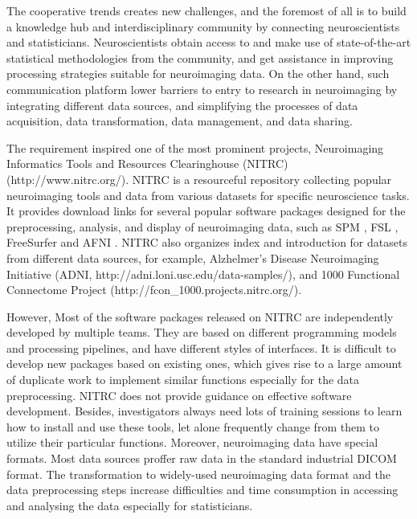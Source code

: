 \documentclass{nature}
\begin{document}
The cooperative trends creates new challenges, and the foremost of all is to build a knowledge hub and interdisciplinary community by connecting neuroscientists and statisticians.  Neuroscientists obtain access to and make use of state-of-the-art statistical methodologies from the community, and get assistance in improving processing strategies suitable for neuroimaging data. On the other hand, such communication platform lower barriers to entry to research in neuroimaging by integrating different data sources, and simplifying the processes of data acquisition, data transformation, data management, and data sharing. 

The requirement inspired one of the most prominent projects, Neuroimaging Informatics Tools and Resources Clearinghouse (NITRC) (http://www.nitrc.org/). NITRC is a resourceful repository collecting popular neuroimaging tools and data from various datasets for specific neuroscience tasks. It provides download links for several popular software packages designed for the preprocessing, analysis, and display of neuroimaging data, such as SPM \cite{penny2011statistical}, FSL \cite{jenkinson2012fsl}, FreeSurfer \cite{fischl2012freesurfer} and AFNI \cite{cox1996afni}. NITRC also organizes index and introduction for datasets from different data sources, for example, Alzhelmer's Disease Neuroimaging Initiative (ADNI, http://adni.loni.usc.edu/data-samples/), and 1000 Functional Connectome Project (http://fcon\_1000.projects.nitrc.org/).    

However,  Most of the software packages released on NITRC are independently developed by multiple teams. They are based on different programming models and processing pipelines, and have different styles of interfaces. It is difficult to develop new packages based on existing ones, which gives rise to a large amount of duplicate work to implement similar functions especially for the data preprocessing. NITRC does not provide guidance on effective software development. Besides, investigators always need lots of training sessions to learn how to install and use these tools, let alone frequently change from them to utilize their particular functions. Moreover, neuroimaging data have special formats. Most data sources proffer raw data in the standard industrial DICOM format. The transformation to widely-used neuroimaging data format and the data preprocessing steps increase difficulties and time consumption in accessing and analysing the data especially for statisticians. 
\end{document}
